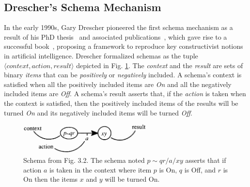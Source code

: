 \documentclass[runningheads]{llncs}
\begin{document}

\subsection{Drescher's Schema Mechanism}

In the early 1990s, Gary Drescher pioneered the first schema mechanism as a result of his PhD thesis~\cite{Drescher:1989} and associated publications~\cite{Drescher:1987,Drescher:1993}, which gave rise to a successful book~\cite{drescher_made-up_1991}, proposing a framework to reproduce key constructivist notions in artificial intelligence.
Drescher formalized schemas as the tuple $\langle \textit{context}, \textit{action}, \textit{result} \rangle$ depicted in Fig. \ref{fig:drescher}.
The \textit{context} and the \textit{result} are sets of binary \textit{items} that can be \textit{positively} or \textit{negatively} included. 
A schema's context is satisfied when all the positively included items are \textit{On} and all the negatively included items are \textit{Off}. 
A schema's result asserts that, if the \textit{action} is taken when the context is satisfied, then the positively included items of the results will be turned \textit{On} and its negatively included items will be turned \textit{Off}.

\begin{figure}
	\centering
	\includegraphics[width=0.6\textwidth]{Figure_2_schema_drescher.png}
	\caption{Schema from \cite{drescher_made-up_1991} Fig. 3.2.
		The schema noted $p \!\sim\! qr/a/xy$ asserts that if action $a$ is taken in the context where item $p$ is On, $q$ is Off, and $r$ is On then the items $x$ and $y$ will be turned On.} 
	\label{fig:drescher}
\end{figure}
\end{document}
